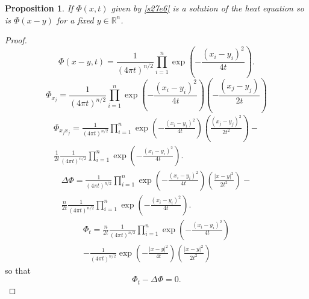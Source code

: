 \documentclass{article}
\theoremstyle{plain}
\numberwithin{thm}{section}
\theoremstyle{plain}
\newtheorem{prop}{Proposition}
\numberwithin{prop}{section}
\theoremstyle{definition}
\numberwithin{defn}{section}
\theoremstyle{remark}
\numberwithin{equation}{section}
\begin{document}
\begin{prop}\label{s27p2}
If $\Phi(x, t)$ given by \eqref{s27e6} is a solution of the heat equation so is $\Phi(x - y)$ for a fixed $y \in
\mathbb{R}^n$.
\end{prop}
\begin{proof}
\[
\Phi(x - y, t) = \frac{1}{(4\pi t)^{n/2}}\prod_{i=1}^n\exp\left(-\frac{(x_i - y_i)^2}{4t}\right).
\]
\[
\Phi_{x_j} = 
\frac{1}{(4\pi t)^{n/2}}\prod_{i=1}^n\exp\left(-\frac{(x_i - y_i)^2}{4t}\right)\left(-\frac{(x_j - y_j)}{2t}\right)
\]
\[
\begin{split}
\Phi_{x_jx_j} = 
\frac{1}{(4\pi t)^{n/2}}\prod_{i=1}^n\exp\left(-\frac{(x_i - y_i)^2}{4t}\right)
\left(\frac{(x_j - y_j)^2}{2t^2}\right) - \\
\frac{1}{2t}\frac{1}{(4\pi t)^{n/2}}\prod_{i=1}^n\exp\left(-\frac{(x_i - y_i)^2}{4t}\right).
\end{split}
\]
\[
\begin{split}
\Delta\Phi = 
\frac{1}{(4\pi t)^{n/2}}\prod_{i=1}^n\exp\left(-\frac{(x_i - y_i)^2}{4t}\right)
\left(\frac{|x - y|^2}{2t^2}\right) - \\                 
\frac{n}{2t}\frac{1}{(4\pi t)^{n/2}}\prod_{i=1}^n\exp\left(-\frac{(x_i - y_i)^2}{4t}\right).
\end{split}
\]
\[
\begin{split}
\Phi_t = \frac{n}{2t}\frac{1}{(4\pi t)^{n/2}}\prod_{i=1}^n\exp\left(-\frac{(x_i - y_i)^2}{4t}\right) \\
- \frac{1}{(4\pi t)^{n/2}}\exp\left(-\frac{|x - y|^2}{4t}\right)\left(\frac{|x - y|^2}{2t^2}\right)
\end{split}
\]
so that
\[
\Phi_t - \Delta\Phi = 0.
\]
\end{proof}    
\end{document}
